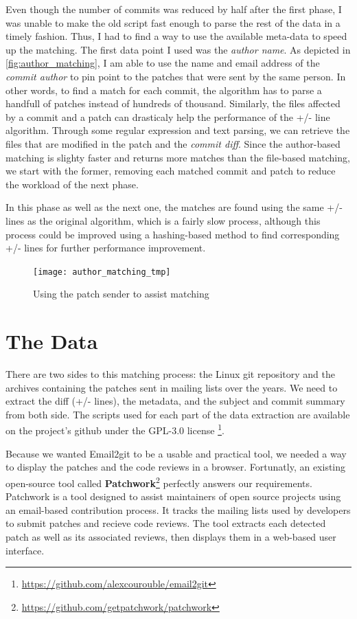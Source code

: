 Even though the number of commits was reduced by half after the first phase, I was unable to make the old script fast enough to parse the rest of the data in a timely fashion. Thus, I had to find a way to use the available meta-data to speed up the matching. The first data point I used was the \textit{author name}. As depicted in \autoref{fig:author_matching}, I am able to use the name and email address of the \textit{commit author} to pin point to the patches that were sent by the same person. In other words, to find a match for each commit, the algorithm has to parse a handfull of patches instead of hundreds of thousand. Similarly, the files affected by a commit and a patch can drasticaly help the performance of the +/- line algorithm. Through some regular expression and text parsing, we can retrieve the files that are modified in the patch and the \textit{commit diff}. Since the author-based matching is slighty faster and returns more matches than the file-based matching, we start with the former, removing each matched commit and patch to reduce the workload of the next phase.

In this phase as well as the next one, the matches are found using the same +/- lines as the original algorithm, which is a fairly slow process, although this process could be improved using a hashing-based method to find corresponding +/- lines for further performance improvement. 



\begin{figure}[htb]
\centering
\texttt{[image: author\_matching\_tmp]}
\caption{Using the patch sender to assist matching}
\label{fig:author_matching}
\end{figure}


\section{The Data}

There are two sides to this matching process: the Linux git repository and the archives containing the patches sent in mailing lists over the years. We need to extract the diff (+/- lines), the metadata, and the subject and commit summary from both side. The scripts used for each part of the data extraction are available on the project's github under the GPL-3.0 license \footnote{\url{https://github.com/alexcourouble/email2git}}.

Because we wanted Email2git to be a usable and practical tool, we needed a way to display the patches and the code reviews in a browser. Fortunatly, an existing open-source tool called \textbf{Patchwork}\footnote{\url{https://github.com/getpatchwork/patchwork}} perfectly answers our requirements. Patchwork is a tool designed to assist maintainers of open source projects using an email-based contribution process. It tracks the mailing lists used by developers to submit patches and recieve code reviews. The tool extracts each detected patch as well as its associated reviews, then displays them in a web-based user interface. 

